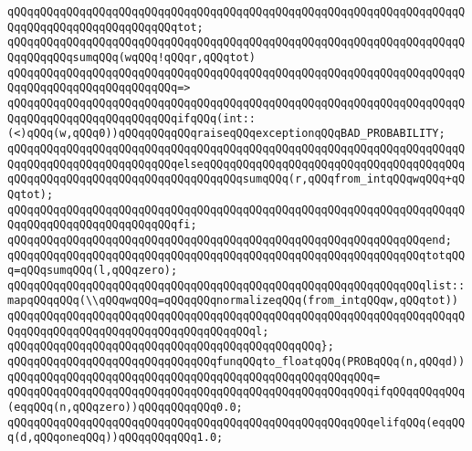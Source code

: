 \verb|qQQqqQQqqQQqqQQqqQQqqQQqqQQqqQQqqQQqqQQqqQQqqQQqqQQqqQQqqQQqqQQqqQQqqQQqqQQqqQQqqQQqqQQqqQQqqQQqtot;|\newline
\newline
\verb|qQQqqQQqqQQqqQQqqQQqqQQqqQQqqQQqqQQqqQQqqQQqqQQqqQQqqQQqqQQqqQQqqQQqqQQqqQQqqQQqsumqQQq(wqQQq!qQQqr,qQQqtot)|\newline
\verb|qQQqqQQqqQQqqQQqqQQqqQQqqQQqqQQqqQQqqQQqqQQqqQQqqQQqqQQqqQQqqQQqqQQqqQQqqQQqqQQqqQQqqQQqqQQqqQQq=>|\newline
\verb|qQQqqQQqqQQqqQQqqQQqqQQqqQQqqQQqqQQqqQQqqQQqqQQqqQQqqQQqqQQqqQQqqQQqqQQqqQQqqQQqqQQqqQQqqQQqqQQqifqQQq(int::(<)qQQq(w,qQQq0))qQQqqQQqqQQqraiseqQQqexceptionqQQqBAD_PROBABILITY;|\newline
\verb|qQQqqQQqqQQqqQQqqQQqqQQqqQQqqQQqqQQqqQQqqQQqqQQqqQQqqQQqqQQqqQQqqQQqqQQqqQQqqQQqqQQqqQQqqQQqqQQqelseqQQqqQQqqQQqqQQqqQQqqQQqqQQqqQQqqQQqqQQqqQQqqQQqqQQqqQQqqQQqqQQqqQQqqQQqqQQqsumqQQq(r,qQQqfrom_intqQQqwqQQq+qQQqtot);|\newline
\verb|qQQqqQQqqQQqqQQqqQQqqQQqqQQqqQQqqQQqqQQqqQQqqQQqqQQqqQQqqQQqqQQqqQQqqQQqqQQqqQQqqQQqqQQqqQQqqQQqfi;|\newline
\verb|qQQqqQQqqQQqqQQqqQQqqQQqqQQqqQQqqQQqqQQqqQQqqQQqqQQqqQQqqQQqqQQqend;|\newline
\newline
\verb|qQQqqQQqqQQqqQQqqQQqqQQqqQQqqQQqqQQqqQQqqQQqqQQqqQQqqQQqqQQqqQQqtotqQQq=qQQqsumqQQq(l,qQQqzero);|\newline
\newline
\verb|qQQqqQQqqQQqqQQqqQQqqQQqqQQqqQQqqQQqqQQqqQQqqQQqqQQqqQQqqQQqqQQqlist::mapqQQqqQQq(\\qQQqwqQQq=qQQqqQQqnormalizeqQQq(from_intqQQqw,qQQqtot))|\newline
\verb|qQQqqQQqqQQqqQQqqQQqqQQqqQQqqQQqqQQqqQQqqQQqqQQqqQQqqQQqqQQqqQQqqQQqqQQqqQQqqQQqqQQqqQQqqQQqqQQqqQQqqQQqqQQql;|\newline
\verb|qQQqqQQqqQQqqQQqqQQqqQQqqQQqqQQqqQQqqQQqqQQqqQQq};|\newline
\newline
\verb|qQQqqQQqqQQqqQQqqQQqqQQqqQQqqQQqfunqQQqto_floatqQQq(PROBqQQq(n,qQQqd))|\newline
\verb|qQQqqQQqqQQqqQQqqQQqqQQqqQQqqQQqqQQqqQQqqQQqqQQqqQQqqQQq=|\newline
\verb|qQQqqQQqqQQqqQQqqQQqqQQqqQQqqQQqqQQqqQQqqQQqqQQqqQQqqQQqifqQQqqQQqqQQq(eqqQQq(n,qQQqzero))qQQqqQQqqQQq0.0;|\newline
\verb|qQQqqQQqqQQqqQQqqQQqqQQqqQQqqQQqqQQqqQQqqQQqqQQqqQQqqQQqelifqQQq(eqqQQq(d,qQQqoneqQQq))qQQqqQQqqQQq1.0;|\newline
